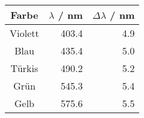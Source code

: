 \begin{tabular}{c|rr}
Farbe & $\lambda$ / nm  & $\Delta\lambda$ / nm \\
\hline
Violett & 403.4 & 4.9\\
Blau & 435.4 & 5.0\\
Türkis & 490.2 & 5.2\\
Grün & 545.3 & 5.4\\
Gelb & 575.6 & 5.5
\end{tabular}